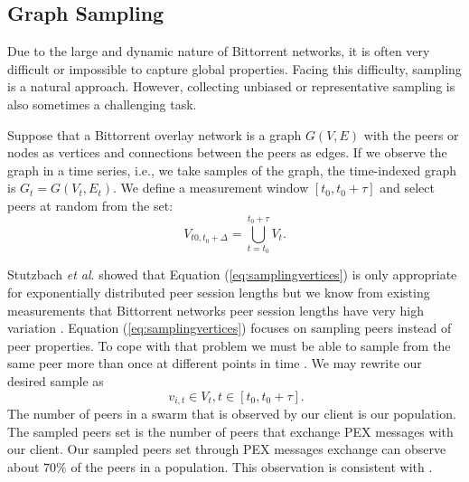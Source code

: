 \documentclass[paper]{ieice}
\begin{document}
\subsection{Graph Sampling}
Due to the large and dynamic nature of Bittorrent networks, it is often very difficult or impossible to capture global properties. 
Facing this difficulty, sampling is a natural approach.
However, collecting unbiased or representative sampling is also sometimes a challenging task.

Suppose that a Bittorrent overlay network is a graph $G(V,E)$ with the peers or nodes as vertices and connections between the peers as edges. 
If we observe the graph in a time series,  i.e., we take samples of the graph, the time-indexed graph is $G_t = G(V_t,E_t)$.   
We define a measurement window $[t_0,t_0 + \tau]$ and select peers at random from the set:
 \begin{equation}
V_{t0,t_0+\Delta} = \bigcup_{t=t_0}^{t_0+\tau} V_t.
 \label{eq:samplingvertices}
 \end{equation}

Stutzbach \textit{et al}. \cite{stutzbach2007sampling} showed that  Equation (\ref{eq:samplingvertices}) is only appropriate for exponentially distributed  peer session lengths but we know from existing measurements that Bittorrent networks peer session lengths have very high variation \cite{guo2005measurements}.  
Equation (\ref{eq:samplingvertices}) focuses on sampling peers instead of peer properties. 
To cope with that problem we must be able to sample from the same peer more than once at different points in time \cite{stutzbach2007sampling}. 
We may rewrite our desired sample as
\begin{equation}
\ v_{i,t} \in V_t  , t \in [t_0, t_0 + \tau].
\label{eq:samplingvertices2}
\end{equation}
The number of peers in a swarm that is observed by our client is our population. 
The sampled peers set is the number of peers that exchange PEX messages with our client.
Our sampled peers set through PEX messages exchange can observe about $70\%$ of the peers in a population.
This observation is consistent with \cite{wu2010understanding}.

\end{document}
